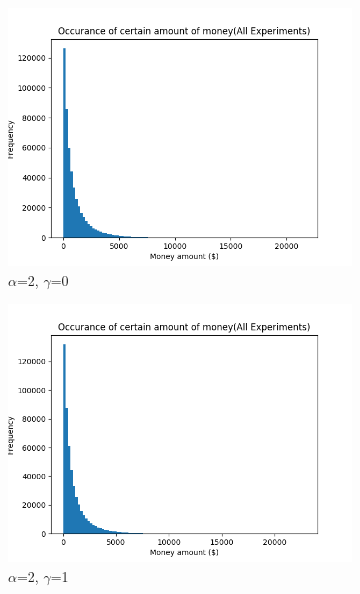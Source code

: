 \documentclass[12pt]{article} %
\begin{document}
\begin{figure}[h!]
	\begin{subfigure}{\scaleTextWidth\textwidth}
		\includegraphics[scale=\scaleResultsA]{a2g0.png}
		\caption{$\alpha$=2, $\gamma$=0}
		\label{fig:a2g0}
	\end{subfigure}
	\begin{subfigure}{\scaleTextWidth\textwidth}
		\includegraphics[scale=\scaleResultsA]{a2g1.png}
		\caption{$\alpha$=2, $\gamma$=1}
		\label{fig:a2g1}
	\end{subfigure}
	\begin{subfigure}{\scaleTextWidth\textwidth}

\end{subfigure}
\end{figure}
\end{document}
